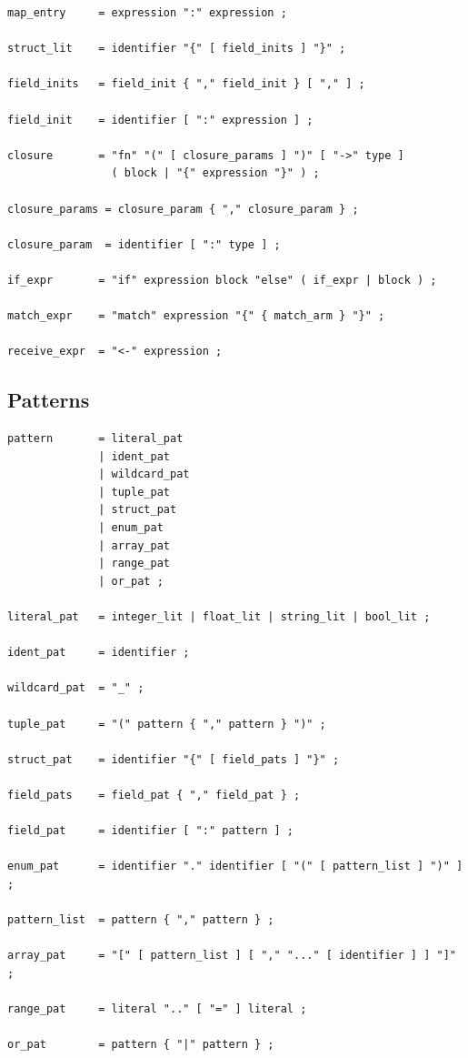 \begin{lstlisting}[language=EBNF]
map_entry     = expression ":" expression ;

struct_lit    = identifier "{" [ field_inits ] "}" ;

field_inits   = field_init { "," field_init } [ "," ] ;

field_init    = identifier [ ":" expression ] ;

closure       = "fn" "(" [ closure_params ] ")" [ "->" type ]
                ( block | "{" expression "}" ) ;

closure_params = closure_param { "," closure_param } ;

closure_param  = identifier [ ":" type ] ;

if_expr       = "if" expression block "else" ( if_expr | block ) ;

match_expr    = "match" expression "{" { match_arm } "}" ;

receive_expr  = "<-" expression ;
\end{lstlisting}

\subsection{Patterns}

\begin{lstlisting}[language=EBNF]
pattern       = literal_pat
              | ident_pat
              | wildcard_pat
              | tuple_pat
              | struct_pat
              | enum_pat
              | array_pat
              | range_pat
              | or_pat ;

literal_pat   = integer_lit | float_lit | string_lit | bool_lit ;

ident_pat     = identifier ;

wildcard_pat  = "_" ;

tuple_pat     = "(" pattern { "," pattern } ")" ;

struct_pat    = identifier "{" [ field_pats ] "}" ;

field_pats    = field_pat { "," field_pat } ;

field_pat     = identifier [ ":" pattern ] ;

enum_pat      = identifier "." identifier [ "(" [ pattern_list ] ")" ] ;

pattern_list  = pattern { "," pattern } ;

array_pat     = "[" [ pattern_list ] [ "," "..." [ identifier ] ] "]" ;

range_pat     = literal ".." [ "=" ] literal ;

or_pat        = pattern { "|" pattern } ;
\end{lstlisting}

